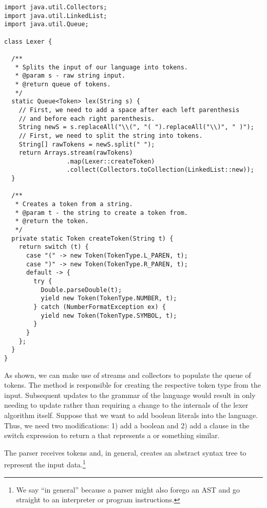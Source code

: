 \enlargethispage{1\baselineskip}
\begin{lstlisting}[language=MyJava]
import java.util.Collectors;
import java.util.LinkedList;
import java.util.Queue;

class Lexer {

  /**
   * Splits the input of our language into tokens.
   * @param s - raw string input.
   * @return queue of tokens.
   */
  static Queue<Token> lex(String s) {
    // First, we need to add a space after each left parenthesis 
    // and before each right parenthesis.
    String newS = s.replaceAll("\\(", "( ").replaceAll("\\)", " )");
    // First, we need to split the string into tokens.
    String[] rawTokens = newS.split(" ");
    return Arrays.stream(rawTokens)
                 .map(Lexer::createToken)
                 .collect(Collectors.toCollection(LinkedList::new));
  }

  /**
   * Creates a token from a string.
   * @param t - the string to create a token from.
   * @return the token.
   */
  private static Token createToken(String t) {
    return switch (t) {
      case "(" -> new Token(TokenType.L_PAREN, t);
      case ")" -> new Token(TokenType.R_PAREN, t);
      default -> {
        try {
          Double.parseDouble(t);
          yield new Token(TokenType.NUMBER, t);
        } catch (NumberFormatException ex) {
          yield new Token(TokenType.SYMBOL, t);
        }
      }
    };
  }
}
\end{lstlisting}

As shown, we can make use of streams and collectors to populate the queue of tokens. 
The  method is responsible for creating the respective token type from the input. 
Subsequent updates to the grammar of the language would result in only needing to update  rather than requiring a change to the internals of the lexer algorithm itself. 
Suppose that we want to add boolean literals into the language. Thus, we need two modifications: 1) add a boolean  and 2) add a clause in the switch expression to return a  that represents a  or something similar.

The parser receives tokens and, in general, creates an abstract syntax tree to represent the input data.\footnote{We say ``in general'' because a parser might also forego an AST and go straight to an interpreter or program instructions.}

